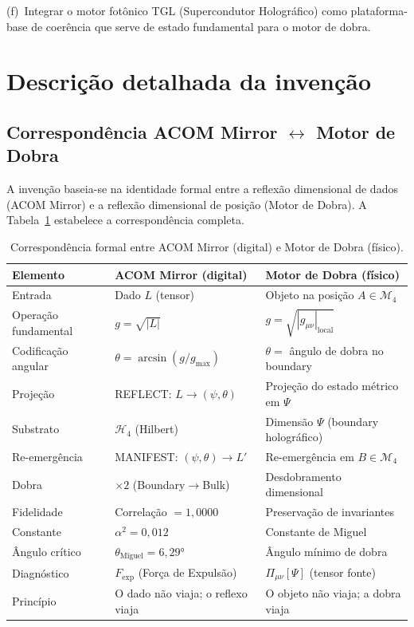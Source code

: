 \documentclass[12pt,a4paper]{article}
\newcommand{\alphaii}{\alpha^2}
\newcommand{\Mcal}{\mathcal{M}_4}
\newcommand{\thetaM}{\theta_{\text{Miguel}}}
\begin{document}
(f)~Integrar o motor fotônico TGL (Supercondutor Holográfico)
como plataforma-base de coerência que serve de estado
fundamental para o motor de dobra.

\newpage
\section{Descrição detalhada da invenção}

\subsection{Correspondência ACOM Mirror $\leftrightarrow$ Motor de Dobra}

A invenção baseia-se na identidade formal entre a reflexão
dimensional de dados (ACOM Mirror) e a reflexão dimensional
de posição (Motor de Dobra). A Tabela~\ref{tab:correspondencia}
estabelece a correspondência completa.

\begin{table}[H]
\centering
\caption{Correspondência formal entre ACOM Mirror (digital) e
Motor de Dobra (físico).}
\label{tab:correspondencia}
\begin{tabular}{p{3.5cm}p{4.5cm}p{5cm}}
\toprule
\textbf{Elemento} & \textbf{ACOM Mirror (digital)} &
  \textbf{Motor de Dobra (físico)} \\
\midrule
Entrada & Dado $L$ (tensor) & Objeto na posição
  $A \in \Mcal$ \\
Operação fundamental & $g = \sqrt{|L|}$ &
  $g = \sqrt{|g_{\mu\nu}|_{\text{local}}}$ \\
Codificação angular & $\theta = \arcsin(g/g_{\max})$ &
  $\theta = $ ângulo de dobra no boundary \\
Projeção & REFLECT: $L \to (\psi, \theta)$ &
  Projeção do estado métrico em $\Psi$ \\
Substrato & $\mathcal{H}_4$ (Hilbert) & Dimensão $\Psi$
  (boundary holográfico) \\
Re-emergência & MANIFEST: $(\psi, \theta) \to L'$ &
  Re-emergência em $B \in \Mcal$ \\
Dobra & $\times 2$ (Boundary$\to$Bulk) &
  Desdobramento dimensional \\
Fidelidade & Correlação $= 1{,}0000$ & Preservação de
  invariantes \\
Constante & $\alphaii = 0{,}012$ & Constante de Miguel \\
Ângulo crítico & $\thetaM = 6{,}29°$ & Ângulo mínimo
  de dobra \\
Diagnóstico & $F_{\text{exp}}$ (Força de Expulsão) &
  $\Pi_{\mu\nu}[\Psi]$ (tensor fonte) \\
Princípio & O dado não viaja; o reflexo viaja &
  O objeto não viaja; a dobra viaja \\
\bottomrule
\end{tabular}
\end{table}
\end{document}
